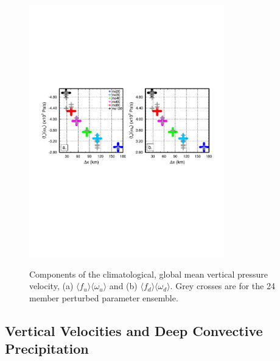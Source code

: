 \documentclass[times]{qjrms4}
\begin{document}
\begin{figure}
\begin{center}
\noindent\includegraphics[width=20pc,angle=0]{figs/temp_diags_2panel.pdf}\\
\end{center}
\caption{Components of the climatological, global mean vertical pressure velocity, (a) $\langle f_{u} \rangle \langle \omega_{u} \rangle$ and (b) $\langle f_{d} \rangle \langle \omega_{d} \rangle$. Grey crosses are for the 24 member perturbed parameter ensemble.}
\label{fig:2panel}
\end{figure}

\subsection{Vertical Velocities and Deep Convective Precipitation}
\end{document}
